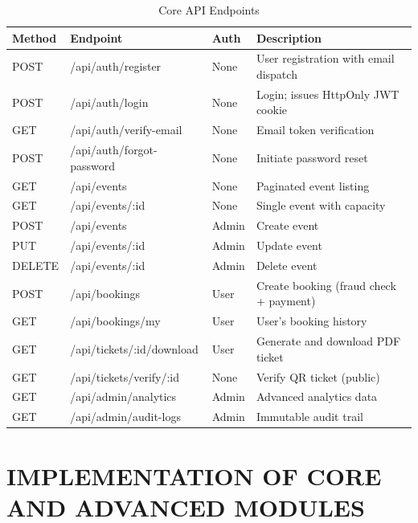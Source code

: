 \documentclass[12pt,a4paper]{report}
\begin{document}
\begin{table}[H]
    \centering
    \caption{Core API Endpoints}
    \vspace{0.2cm}
    \begin{tabular}{|p{1.5cm}|p{5cm}|p{2cm}|p{5cm}|}
        \hline
        \textbf{Method} & \textbf{Endpoint} & \textbf{Auth} & \textbf{Description} \\
        \hline
        POST & /api/auth/register & None & User registration with email dispatch \\
        \hline
        POST & /api/auth/login & None & Login; issues HttpOnly JWT cookie \\
        \hline
        GET & /api/auth/verify-email & None & Email token verification \\
        \hline
        POST & /api/auth/forgot-password & None & Initiate password reset \\
        \hline
        GET & /api/events & None & Paginated event listing \\
        \hline
        GET & /api/events/:id & None & Single event with capacity \\
        \hline
        POST & /api/events & Admin & Create event \\
        \hline
        PUT & /api/events/:id & Admin & Update event \\
        \hline
        DELETE & /api/events/:id & Admin & Delete event \\
        \hline
        POST & /api/bookings & User & Create booking (fraud check + payment) \\
        \hline
        GET & /api/bookings/my & User & User's booking history \\
        \hline
        GET & /api/tickets/:id/download & User & Generate and download PDF ticket \\
        \hline
        GET & /api/tickets/verify/:id & None & Verify QR ticket (public) \\
        \hline
        GET & /api/admin/analytics & Admin & Advanced analytics data \\
        \hline
        GET & /api/admin/audit-logs & Admin & Immutable audit trail \\
        \hline
    \end{tabular}
\end{table}
\chapter{IMPLEMENTATION OF CORE AND ADVANCED MODULES}
\end{document}

